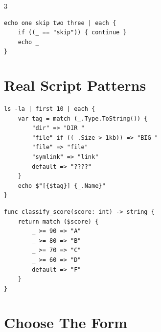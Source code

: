 \begin{multicols*}{3}
\begin{lstlisting}
echo one skip two three | each {
    if ((_ == "skip")) { continue }
    echo _
}
\end{lstlisting}

\columnbreak

\section{Real Script Patterns}
\begin{lstlisting}
ls -la | first 10 | each {
    var tag = match (_.Type.ToString()) {
        "dir" => "DIR "
        "file" if ((_.Size > 1kb)) => "BIG "
        "file" => "file"
        "symlink" => "link"
        default => "????"
    }
    echo $"[{$tag}] {_.Name}"
}
\end{lstlisting}

\begin{lstlisting}
func classify_score(score: int) -> string {
    return match ($score) {
        _ >= 90 => "A"
        _ >= 80 => "B"
        _ >= 70 => "C"
        _ >= 60 => "D"
        default => "F"
    }
}
\end{lstlisting}

\section{Choose The Form}


\end{multicols*}

